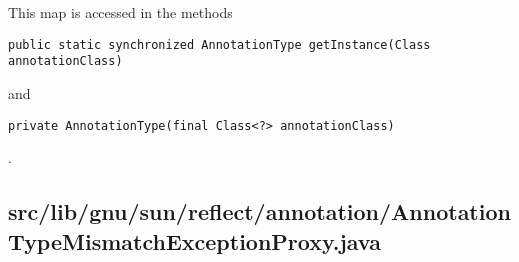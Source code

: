 \documentclass[a4paper, 10pt, titlepage]{scrartcl} %
\begin{document}
This map is accessed in the methods
\begin{scriptsize}\verb|public|\hspace{0.0pt}\verb| |\hspace{0.0pt}\verb|static|\hspace{0.0pt}\verb| |\hspace{0.0pt}\verb|synchronized|\hspace{0.0pt}\verb| |\hspace{0.0pt}\verb|AnnotationType|\hspace{0.0pt}\verb| |\hspace{0.0pt}\verb|getInstance|\hspace{0.0pt}\verb|(|\hspace{0.0pt}\verb|Class|\hspace{0.0pt}\verb| |\hspace{0.0pt}\verb|annotationClass|\hspace{0.0pt}\verb|)|\hspace{0.0pt}\verb||\end{scriptsize}
and \begin{scriptsize}\verb|private|\hspace{0.0pt}\verb| |\hspace{0.0pt}\verb|AnnotationType|\hspace{0.0pt}\verb|(|\hspace{0.0pt}\verb|final|\hspace{0.0pt}\verb| |\hspace{0.0pt}\verb|Class|\hspace{0.0pt}\verb|<|\hspace{0.0pt}\verb||\hspace{0.0pt}\verb|?|\hspace{0.0pt}\verb||\hspace{0.0pt}\verb|>|\hspace{0.0pt}\verb||\hspace{0.0pt}\verb| |\hspace{0.0pt}\verb|annotationClass|\hspace{0.0pt}\verb|)|\hspace{0.0pt}\verb||\end{scriptsize}.

\subsection{src/lib/gnu/sun/reflect/annotation/AnnotationTypeMismatchExceptionProxy.java}
\label{sec:src/lib/gnu/sun/reflect/annotation/AnnotationTypeMismatchExceptionProxy.java}
\end{document}
